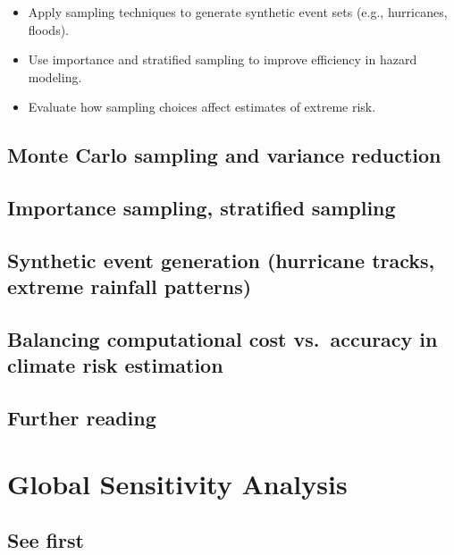 \documentclass[
  letterpaper,
  DIV=11,
  numbers=noendperiod]{scrreprt}
\providecommand{\tightlist}{%
  \setlength{\itemsep}{0pt}\setlength{\parskip}{0pt}}
\begin{document}
\begin{itemize}
\tightlist
\item
  Apply sampling techniques to generate synthetic event sets (e.g.,
  hurricanes, floods).
\item
  Use importance and stratified sampling to improve efficiency in hazard
  modeling.
\item
  Evaluate how sampling choices affect estimates of extreme risk.
\end{itemize}

\section{Monte Carlo sampling and variance
reduction}\label{monte-carlo-sampling-and-variance-reduction}

\section{Importance sampling, stratified
sampling}\label{importance-sampling-stratified-sampling}

\section{Synthetic event generation (hurricane tracks, extreme rainfall
patterns)}\label{synthetic-event-generation-hurricane-tracks-extreme-rainfall-patterns}

\section{Balancing computational cost vs.~accuracy in climate risk
estimation}\label{balancing-computational-cost-vs.-accuracy-in-climate-risk-estimation}

\section*{Further reading}\label{further-reading-11}


\chapter{Global Sensitivity Analysis
🚧}\label{global-sensitivity-analysis-1}

\section*{See first}\label{see-first-8}
\end{document}
